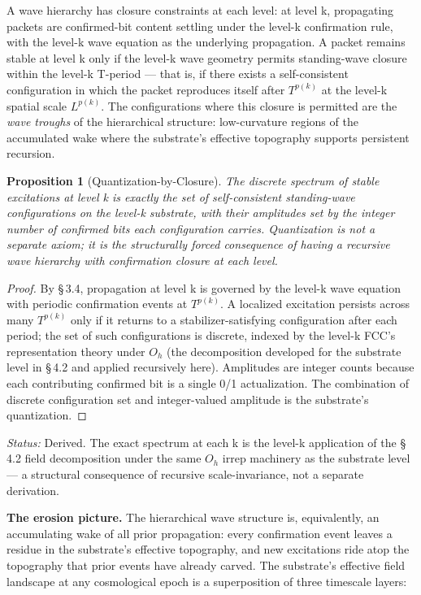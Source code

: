 \documentclass[11pt,oneside]{report}
\newtheorem{proposition}[theorem]{Proposition}
\theoremstyle{definition}
\theoremstyle{remark}
\begin{document}
A wave hierarchy has closure constraints at each level: at level k,
propagating packets are confirmed-bit content settling under the level-k
confirmation rule, with the level-k wave equation as the underlying
propagation. A packet remains stable at level k only if the level-k wave
geometry permits standing-wave closure within the level-k T-period ---
that is, if there exists a self-consistent configuration in which the
packet reproduces itself after \ensuremath{T^{p(k)}} at the level-k spatial scale
\ensuremath{L^{p(k)}.} The configurations where this closure is permitted are the
\emph{wave troughs} of the hierarchical structure: low-curvature regions
of the accumulated wake where the substrate's effective topography
supports persistent recursion.

\begin{proposition}[Quantization-by-Closure]
The discrete
spectrum of stable excitations at level k is exactly the set of
self-consistent standing-wave configurations on the level-k substrate,
with their amplitudes set by the integer number of confirmed bits each
configuration carries. Quantization is not a separate axiom; it is the
structurally forced consequence of having a recursive wave hierarchy
with confirmation closure at each level.
\end{proposition}

\begin{proof}
By \S\,3.4, propagation at level k is governed by the
level-k wave equation with periodic confirmation events at \ensuremath{T^{p(k)}.} A
localized excitation persists across many \ensuremath{T^{p(k)}} only if it returns to
a stabilizer-satisfying configuration after each period; the set of such
configurations is discrete, indexed by the level-k FCC's representation
theory under \ensuremath{O_{h}} (the decomposition developed for the substrate level
in \S\,4.2 and applied recursively here). Amplitudes are integer counts
because each contributing confirmed bit is a single 0/1 actualization.
The combination of discrete configuration set and integer-valued
amplitude is the substrate's quantization.

\end{proof}

\emph{Status:} Derived. The exact spectrum at each k is the level-k
application of the \S\,4.2 field decomposition under the same \ensuremath{O_{h}} irrep
machinery as the substrate level --- a structural consequence of
recursive scale-invariance, not a separate derivation.

\textbf{The erosion picture.} The hierarchical wave structure is,
equivalently, an accumulating wake of all prior propagation: every
confirmation event leaves a residue in the substrate's effective
topography, and new excitations ride atop the topography that prior
events have already carved. The substrate's effective field landscape at
any cosmological epoch is a superposition of three timescale layers:
\end{document}
